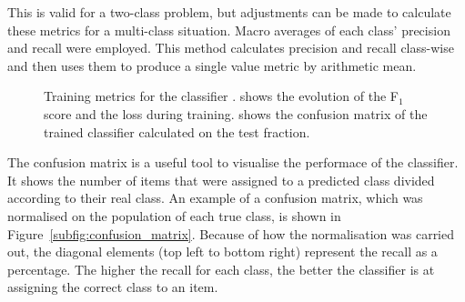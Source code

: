 This is valid for a two-class problem, but adjustments can be made to calculate these metrics for a multi-class situation. Macro averages of each class' precision and recall were employed. This method calculates precision and recall class-wise and then uses them to produce a single value metric by arithmetic mean.

\begin{figure}
    \centering
    \caption[Training metrics for the classifier.]{Training metrics for the classifier \cite{Brugnolotto2024}.  shows the evolution of the F\(_1\) score and the loss during training.  shows the confusion matrix of the trained classifier calculated on the test fraction.}
    \label{fig:training_metrics}
\end{figure}

The confusion matrix is a useful tool to visualise the performace of the classifier. It shows the number of items that were assigned to a predicted class divided according to their real class. An example of a confusion matrix, which was normalised on the population of each true class, is shown in Figure~\ref{subfig:confusion_matrix}. Because of how the normalisation was carried out, the diagonal elements (top left to bottom right) represent the recall as a percentage. The higher the recall for each class, the better the classifier is at assigning the correct class to an item. 

